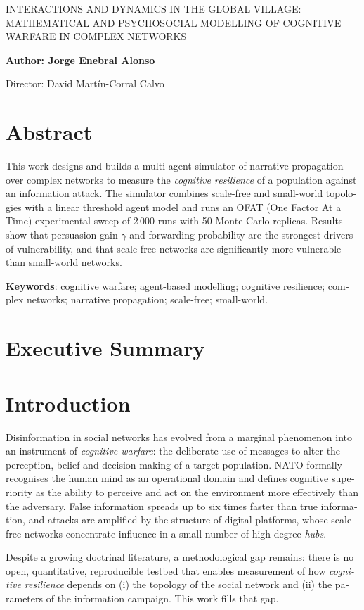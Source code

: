\documentclass[12pt]{extarticle}
\numberwithin{equation}{section}
\newcommand{\blankpage}{
    \clearpage
    \thispagestyle{empty}
    \mbox{}
    \clearpage
}
\newcommand{\projectTitleEnglish}{Interactions and Dynamics in the Global Village: Mathematical and Psychosocial Modelling of Cognitive Warfare in Complex Networks}
\newcommand{\Author}{Jorge Enebral Alonso}
\newcommand{\Director}{David Martín-Corral Calvo}
\newcommand{\sectionnotoc}[1]{%
    \refstepcounter{section}%
    \section*{\thesection\quad #1}%
}
\newcommand{\resetcounters}{
    \setcounter{section}{0}
    \setcounter{subsection}{0}
    \setcounter{subsubsection}{0}
    \setcounter{figure}{0}
    \setcounter{table}{0}
    \setcounter{equation}{0}
    \setcounter{footnote}{0}
}
\begin{document}
\blankpage

\resetcounters

\begin{otherlanguage}{english}

{\large \MakeUppercase{\projectTitleEnglish}}
\vspace{3mm}

\textbf{Author: \Author}

Director: \Director

\section*{Abstract}

This work designs and builds a multi-agent simulator of narrative propagation over complex networks to measure the \emph{cognitive resilience} of a population against an information attack. The simulator combines scale-free and small-world topologies with a linear threshold agent model and runs an OFAT (One Factor At a Time) experimental sweep of 2\,000 runs with 50 Monte Carlo replicas. Results show that persuasion gain $\gamma$ and forwarding probability are the strongest drivers of vulnerability, and that scale-free networks are significantly more vulnerable than small-world networks.

\textbf{Keywords}: cognitive warfare; agent-based modelling; cognitive resilience; complex networks; narrative propagation; scale-free; small-world.

\section*{Executive Summary}

\sectionnotoc{Introduction}

Disinformation in social networks has evolved from a marginal phenomenon into an instrument of \emph{cognitive warfare}: the deliberate use of messages to alter the perception, belief and decision-making of a target population. NATO formally recognises the human mind as an operational domain and defines cognitive superiority as the ability to perceive and act on the environment more effectively than the adversary. False information spreads up to six times faster than true information, and attacks are amplified by the structure of digital platforms, whose scale-free networks concentrate influence in a small number of high-degree \emph{hubs}.

Despite a growing doctrinal literature, a methodological gap remains: there is no open, quantitative, reproducible testbed that enables measurement of how \emph{cognitive resilience} depends on (i) the topology of the social network and (ii) the parameters of the information campaign. This work fills that gap.


\end{otherlanguage}
\end{document}
